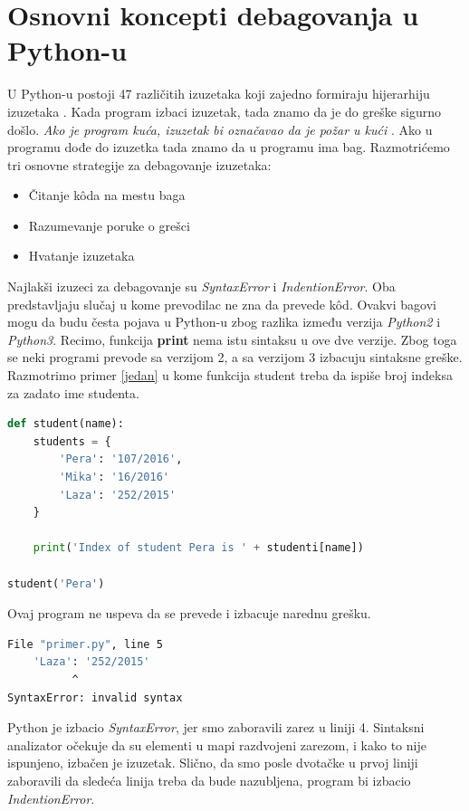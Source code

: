 \documentclass[a4paper]{article}
\begin{document}
\section{Osnovni koncepti debagovanja u Python-u}
U Python-u postoji 47 različitih izuzetaka koji zajedno formiraju hijerarhiju izuzetaka \cite{excDocPyt}. Kada program izbaci izuzetak, tada znamo da je do greške sigurno došlo. \emph{Ako je program kuća, izuzetak bi označavao da je požar u kući} \cite{proPyDeb}. Ako u programu dođe do izuzetka tada znamo da u programu ima bag. Razmotrićemo tri osnovne strategije za debagovanje izuzetaka:
\begin{itemize}
\item Čitanje k\^{o}da na mestu baga
\item Razumevanje poruke o grešci
\item Hvatanje izuzetaka
\end{itemize}
Najlakši izuzeci za debagovanje su \emph{SyntaxError} i  \emph{IndentionError}. Oba predstavljaju slučaj u kome prevodilac ne zna da prevede k\^{o}d. Ovakvi bagovi mogu da budu česta pojava u Python-u zbog razlika između verzija \emph{Python2} i \emph{Python3}. Recimo, funkcija \textbf{print} nema istu sintaksu u ove dve verzije. Zbog toga se neki programi prevode sa verzijom 2, a sa verzijom 3 izbacuju sintaksne greške. Razmotrimo primer \ref{jedan} u kome funkcija student treba da ispiše broj indeksa za zadato ime studenta.
\begin{lstlisting}[language = Python, caption={Funkcija student ispisuje broj indeksa za zadato ime studenta}, label=jedan]
def student(name):
    students = {
        'Pera': '107/2016',
        'Mika': '16/2016'
        'Laza': '252/2015'
    }

    print('Index of student Pera is ' + studenti[name])

student('Pera')
\end{lstlisting}
Ovaj program ne uspeva da se prevede i izbacuje narednu grešku.
\begin{lstlisting}[language = bash, caption={Ispis iz konzole za primer \ref{jedan}}, label=dva]
  File "primer.py", line 5
    'Laza': '252/2015'
          ^
SyntaxError: invalid syntax
\end{lstlisting}
Python je izbacio \emph{SyntaxError}, jer smo zaboravili zarez u liniji 4. Sintaksni analizator očekuje da su elementi u mapi razdvojeni zarezom, i kako to nije ispunjeno, izbačen je izuzetak. Slično, da smo posle dvotačke u prvoj liniji zaboravili da sledeća linija treba da bude nazubljena, program bi izbacio \emph{IndentionError}.
\end{document}
